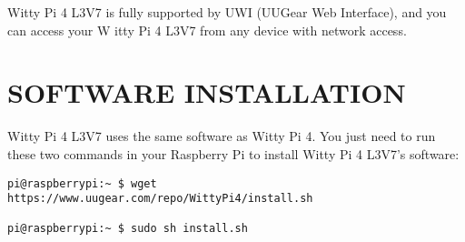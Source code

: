 \documentclass{article}\usepackage[]{graphicx}\usepackage[]{xcolor}
\begin{document}
Witty Pi 4 L3V7 is fully supported by UWI (UUGear Web Interface), and you can access your W itty Pi 4 L3V7 from any device with network access.

\section{SOFTWARE INSTALLATION}

Witty Pi 4 L3V7 uses the same software as Witty Pi 4. You just need to run these two commands in your Raspberry Pi to install Witty Pi 4 L3V7’s software:

\begin{verbatim}
pi@raspberrypi:~ $ wget https://www.uugear.com/repo/WittyPi4/install.sh

pi@raspberrypi:~ $ sudo sh install.sh

\end{verbatim}
\end{document}
